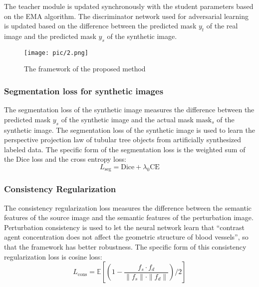 The teacher module is updated synchronously with the student parameters based on the EMA algorithm. 
The discriminator network used for adversarial learning is updated based on the difference between the predicted mask $y_t$ of the real image and the predicted mask $y_s$ of the synthetic image.


\begin{figure*}[htbp]
  \centering
  \texttt{[image: pic/2.png]}
  \caption{The framework of the proposed method}
  \label{fig:framework}
\end{figure*}


\subsubsection{Segmentation loss for synthetic images}
The segmentation loss of the synthetic image measures the difference between the predicted mask $y_s$ of the synthetic image and the actual mask $\text{mask}_s$ of the synthetic image. The segmentation loss of the synthetic image is used to learn the perspective projection law of tubular tree objects from artificially synthesized labeled data. The specific form of the segmentation loss is the weighted sum of the Dice loss and the cross entropy loss:
\begin{equation}
L_{\text{seg}} = \text{Dice} + \lambda_0 \text{CE}
\end{equation}


\subsubsection{Consistency Regularization}
The consistency regularization loss measures the difference between the semantic features of the source image and the semantic features of the perturbation image. Perturbation consistency is used to let the neural network learn that ``contrast agent concentration does not affect the geometric structure of blood vessels'', so that the framework has better robustness. The specific form of this consistency regularization loss is cosine loss:
\begin{equation}
L_{\text{cons}} = \mathbb{E} \left[ \left( 1 - \frac{f_s \cdot f_d}{\|f_s\| \cdot \|f_d\|} \right) / 2 \right]
\end{equation}


